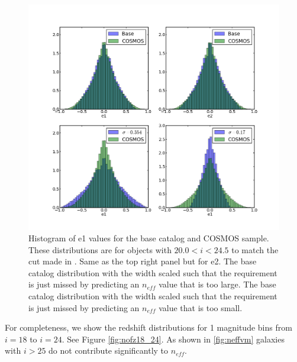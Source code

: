 \documentclass[]{article}
\begin{document}
\begin{figure}[H]
\centering
\includegraphics[width=\textwidth]{validation_figures/e_hist.png}
\caption{Histogram of e1 values for the base catalog and COSMOS sample.  These distributions are for objects with $20.0 < i < 24.5$ to match
the cut made in \citet{chang}.
Same as the top right panel but for e2.
The base catalog distribution with the width scaled such that the requirement is just missed by predicting an $n_{eff}$ value that is too large.
The base catalog distribution with the width scaled such that the requirement is just missed by predicting an $n_{eff}$ value that is too small.
\label{e_hist}}
\end{figure}

For completeness, we show the redshift distributions for 1 magnitude bins from $i=18$ to $i=24$.  See Figure \ref{fig:nofz18_24}.  As shown in \ref{fig:neffvm}
galaxies with $i > 25$ do not contribute significantly to $n_{eff}$. 
\end{document}
